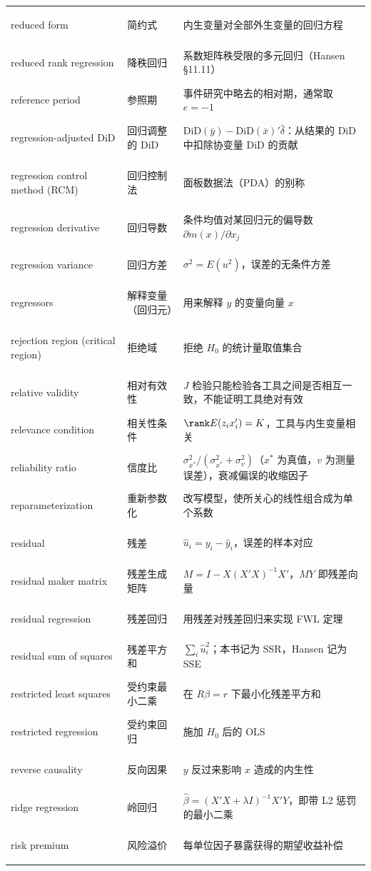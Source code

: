 \begin{longtable}{@{}>{\bfseries\boldmath\raggedright\arraybackslash}p{4.6cm}>{\raggedright\arraybackslash}p{3.2cm}>{\raggedright\arraybackslash}p{\dimexpr\textwidth-7.8cm-4\tabcolsep\relax}@{}}
reduced form & 简约式 & 内生变量对全部外生变量的回归方程 \\
reduced rank regression & 降秩回归 & 系数矩阵秩受限的多元回归（Hansen §11.11） \\
reference period & 参照期 & 事件研究中略去的相对期，通常取 $e=-1$ \\
regression-adjusted DiD & 回归调整的 DiD & $\mathrm{DiD}(\bar y)-\mathrm{DiD}(\bar x)'\hat\delta$：从结果的 DiD 中扣除协变量 DiD 的贡献 \\
regression control method (RCM) & 回归控制法 & 面板数据法（PDA）的别称 \\
regression derivative & 回归导数 & 条件均值对某回归元的偏导数 $\partial m(x)/\partial x_j$ \\
regression variance & 回归方差 & $\sigma^2=E(u^2)$，误差的无条件方差 \\
regressors & 解释变量（回归元） & 用来解释 $y$ 的变量向量 $x$ \\
rejection region (critical region) & 拒绝域 & 拒绝 $H_0$ 的统计量取值集合 \\
relative validity & 相对有效性 & $J$ 检验只能检验各工具之间是否相互一致，不能证明工具绝对有效 \\
relevance condition & 相关性条件 & $\rank E(z_ix_i')=K$，工具与内生变量相关 \\
reliability ratio & 信度比 & $\sigma^2_{x^*}/(\sigma^2_{x^*}+\sigma^2_v)$（$x^*$ 为真值，$v$ 为测量误差），衰减偏误的收缩因子 \\
reparameterization & 重新参数化 & 改写模型，使所关心的线性组合成为单个系数 \\
residual & 残差 & $\hat u_i=y_i-\hat y_i$，误差的样本对应 \\
residual maker matrix & 残差生成矩阵 & $M=I-X(X'X)^{-1}X'$，$MY$ 即残差向量 \\
residual regression & 残差回归 & 用残差对残差回归来实现 FWL 定理 \\
residual sum of squares & 残差平方和 & $\sum_i\hat u_i^2$；本书记为 SSR，Hansen 记为 SSE \\
restricted least squares & 受约束最小二乘 & 在 $R\beta=r$ 下最小化残差平方和 \\
restricted regression & 受约束回归 & 施加 $H_0$ 后的 OLS \\
reverse causality & 反向因果 & $y$ 反过来影响 $x$ 造成的内生性 \\
ridge regression & 岭回归 & $\hat\beta=(X'X+\lambda I)^{-1}X'Y$，即带 L2 惩罚的最小二乘 \\
risk premium & 风险溢价 & 每单位因子暴露获得的期望收益补偿 \\

\end{longtable}
